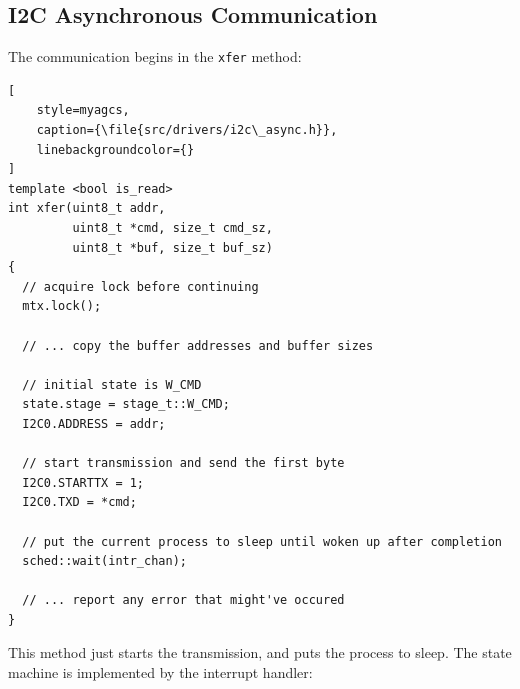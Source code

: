 \subsection{I2C Asynchronous Communication}
\label{sec:i2c_async}

The communication begins in the \lstinline[style=myagc]|xfer| method:
\begin{lstlisting}[
    style=myagcs,
    caption={\file{src/drivers/i2c\_async.h}},
    linebackgroundcolor={}
]
template <bool is_read>
int xfer(uint8_t addr,
         uint8_t *cmd, size_t cmd_sz, 
         uint8_t *buf, size_t buf_sz)
{
  // acquire lock before continuing
  mtx.lock(); 

  // ... copy the buffer addresses and buffer sizes

  // initial state is W_CMD
  state.stage = stage_t::W_CMD;
  I2C0.ADDRESS = addr;

  // start transmission and send the first byte
  I2C0.STARTTX = 1;
  I2C0.TXD = *cmd;

  // put the current process to sleep until woken up after completion
  sched::wait(intr_chan);
   
  // ... report any error that might've occured
}
\end{lstlisting}

This method just starts the transmission, and puts the process to sleep. The state
machine is implemented by the interrupt handler:

